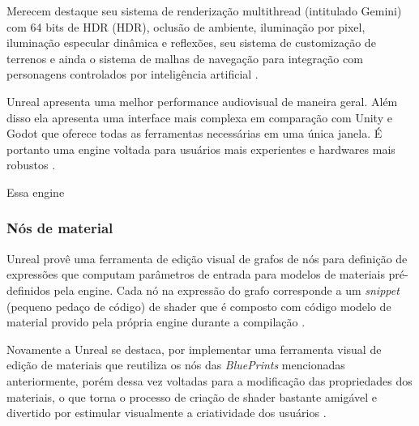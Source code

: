 Merecem destaque seu sistema de renderização \Gls{multithread} (intitulado Gemini) com 64 bits de HDR (\acrlong{HDR}), oclusão de ambiente, iluminação por pixel, iluminação especular dinâmica e reflexões, seu sistema de customização de terrenos e ainda o sistema de malhas de navegação para integração com personagens controlados por inteligência artificial \cite{armstrong2013game}.

Unreal apresenta uma melhor performance audiovisual de maneira geral. Além disso ela apresenta uma interface mais complexa em comparação com Unity e Godot que oferece todas as ferramentas necessárias em uma única janela. É portanto uma engine voltada para usuários mais experientes e hardwares mais robustos \cite{stelios2017}.

Essa engine 
 
\subsubsection{Nós de material}
\label{sec:material-nodes}

Unreal provê uma ferramenta de edição visual de grafos de nós para definição de expressões que computam parâmetros de entrada para modelos de materiais pré-definidos pela engine. Cada nó na expressão do grafo corresponde a um \textit{snippet} (pequeno pedaço de código) de shader que é composto com código modelo de material provido pela própria engine durante a compilação \cite{he2016rapid}.

Novamente a Unreal se destaca, por implementar uma ferramenta visual de edição de materiais que reutiliza os nós das \textit{BluePrints} mencionadas anteriormente, porém dessa vez voltadas para a modificação das propriedades dos materiais, o que torna o processo de criação de shader bastante amigável e divertido por estimular visualmente a criatividade dos usuários \cite{compStudyGE}. 

\begin{figure}[h!]
	\centering
\end{figure}
\nocite{materialUnreal}

